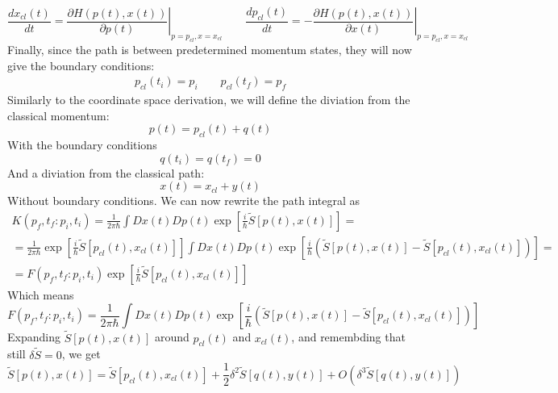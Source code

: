 \documentclass{article}
\begin{document}
\begin{equation}
    \frac{dx_{cl}(t)}{dt} = \left.\frac{\partial H(p(t),x(t))}{\partial p(t)}\right|_{p=p_{cl}, x=x_{cl}}
    \qquad
    \frac{dp_{cl}(t)}{dt} = -\left.\frac{\partial H(p(t),x(t))}{\partial x(t)}\right|_{p=p_{cl}, x=x_{cl}}
\end{equation} 
Finally, since the path is between predetermined momentum states, they will now give the boundary conditions:
\begin{equation}
\begin{gathered}
    p_{cl}(t_i) = p_i \qquad p_{cl}(t_f) = p_f
\end{gathered}
\end{equation}
Similarly to the coordinate space derivation, we will define the diviation from the classical momentum:
\begin{equation}
    p(t) = p_{cl}(t) + q(t)
\end{equation}
With the boundary conditions
\begin{equation}
    q(t_i) = q(t_f) = 0
\end{equation}
And a diviation from the classical path:
\begin{equation}
    x(t) = x_{cl} + y(t)
\end{equation}
Without boundary conditions.
We can now rewrite the path integral as
\begin{equation}
\begin{gathered}
    K(p_f, t_f : p_i, t_i) = \frac{1}{2\pi\hbar}\int Dx(t) Dp(t) \exp[\frac{i}{\hbar}\tilde{S}[p(t), x(t)]] =
    \\
    = \frac{1}{2\pi\hbar} \exp[\frac{i}{\hbar}\tilde{S}[p_{cl}(t),x_{cl}(t)]] \int Dx(t) Dp(t) \exp[\frac{i}{\hbar}\left(\tilde{S}[p(t),x(t)] - \tilde{S}[p_{cl}(t),x_{cl}(t)]\right)] =
    \\
    = F(p_f, t_f : p_i, t_i) \exp[\frac{i}{\hbar}\tilde{S}[p_{cl}(t),x_{cl}(t)]] 
\end{gathered}
\end{equation}
Which means
\begin{equation}
    F(p_f, t_f : p_i, t_i) = \frac{1}{2\pi\hbar} \int Dx(t) Dp(t) \exp[\frac{i}{\hbar}\left(\tilde{S}[p(t), x(t)] - \tilde{S}[p_{cl}(t), x_{cl}(t)]\right)]
\end{equation}
Expanding $\tilde{S}[p(t),x(t)]$ around $p_{cl}(t)$ and $x_{cl}(t)$, and remembding that still $\delta\tilde{S} = 0$, we get
\begin{equation}
    \tilde{S}[p(t), x(t)] = \tilde{S}[p_{cl}(t), x_{cl}(t)] + \frac{1}{2}\delta^2\tilde{S}[q(t), y(t)] + O(\delta^3\tilde{S}[q(t),y(t)])
\end{equation}
\end{document}
